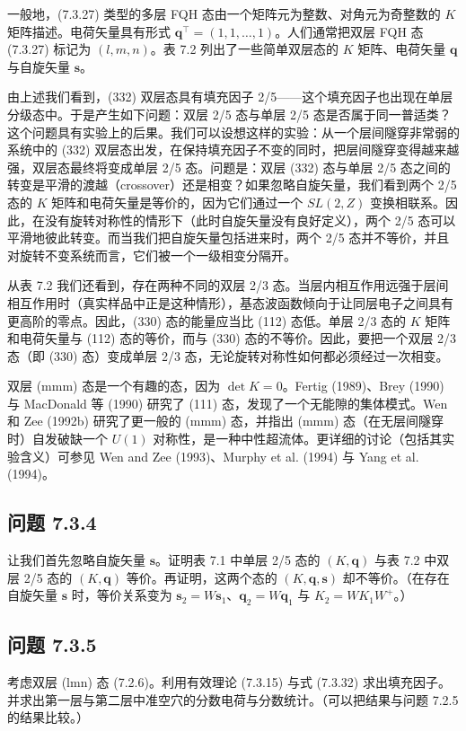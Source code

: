 一般地，(7.3.27) 类型的多层 FQH 态由一个矩阵元为整数、对角元为奇整数的 $K$ 矩阵描述。电荷矢量具有形式 $\boldsymbol{q}^{\top}=(1,1,\ldots,1)$。人们通常把双层 FQH 态 (7.3.27) 标记为 $(l,m,n)$。表 7.2 列出了一些简单双层态的 $K$ 矩阵、电荷矢量 $\boldsymbol{q}$ 与自旋矢量 $\boldsymbol{s}$。

由上述我们看到，(332) 双层态具有填充因子 2/5——这个填充因子也出现在单层分级态中。于是产生如下问题：双层 2/5 态与单层 2/5 态是否属于同一普适类？这个问题具有实验上的后果。我们可以设想这样的实验：从一个层间隧穿非常弱的系统中的 (332) 双层态出发，在保持填充因子不变的同时，把层间隧穿变得越来越强，双层态最终将变成单层 2/5 态。问题是：双层 (332) 态与单层 2/5 态之间的转变是平滑的渡越（crossover）还是相变？如果忽略自旋矢量，我们看到两个 2/5 态的 $K$ 矩阵和电荷矢量是等价的，因为它们通过一个 $SL(2,Z)$ 变换相联系。因此，在没有旋转对称性的情形下（此时自旋矢量没有良好定义），两个 2/5 态可以平滑地彼此转变。而当我们把自旋矢量包括进来时，两个 2/5 态并不等价，并且对旋转不变系统而言，它们被一个一级相变分隔开。

从表 7.2 我们还看到，存在两种不同的双层 2/3 态。当层内相互作用远强于层间相互作用时（真实样品中正是这种情形），基态波函数倾向于让同层电子之间具有更高阶的零点。因此，(330) 态的能量应当比 (112) 态低。单层 2/3 态的 $K$ 矩阵和电荷矢量与 (112) 态的等价，而与 (330) 态的不等价。因此，要把一个双层 2/3 态（即 (330) 态）变成单层 2/3 态，无论旋转对称性如何都必须经过一次相变。

双层 (mmm) 态是一个有趣的态，因为 $\det K=0$。Fertig (1989)、Brey (1990) 与 MacDonald 等 (1990) 研究了 (111) 态，发现了一个无能隙的集体模式。Wen 和 Zee (1992b) 研究了更一般的 (mmm) 态，并指出 (mmm) 态（在无层间隧穿时）自发破缺一个 $U(1)$ 对称性，是一种中性超流体。更详细的讨论（包括其实验含义）可参见 Wen and Zee (1993)、Murphy et al. (1994) 与 Yang et al. (1994)。

\subsection*{问题 7.3.4}
让我们首先忽略自旋矢量 $\boldsymbol{s}$。证明表 7.1 中单层 2/5 态的 $(K,\boldsymbol{q})$ 与表 7.2 中双层 2/5 态的 $(K,\boldsymbol{q})$ 等价。再证明，这两个态的 $(K,\boldsymbol{q},\boldsymbol{s})$ 却不等价。（在存在自旋矢量 $\boldsymbol{s}$ 时，等价关系变为 $\boldsymbol{s}_{2}=W\boldsymbol{s}_{1}$、$\boldsymbol{q}_{2}=W\boldsymbol{q}_{1}$ 与 $K_{2}=WK_{1}W^{+}$。）

\subsection*{问题 7.3.5}
考虑双层 (lmn) 态 (7.2.6)。利用有效理论 (7.3.15) 与式 (7.3.32) 求出填充因子。并求出第一层与第二层中准空穴的分数电荷与分数统计。（可以把结果与问题 7.2.5 的结果比较。）

